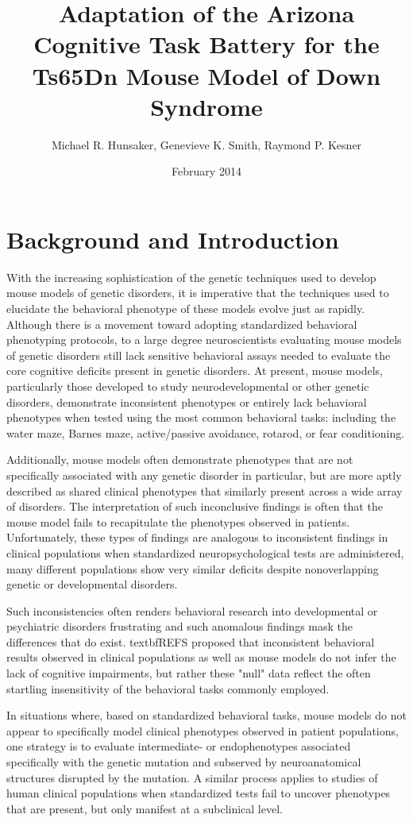 \documentclass{article}
\title{Adaptation of the Arizona Cognitive Task Battery for the Ts65Dn Mouse Model of Down Syndrome}
\author{Michael R. Hunsaker, Genevieve K. Smith, Raymond P. Kesner}
\date{February 2014}
\begin{document}
\maketitle

\section{Background and Introduction}
With the increasing sophistication of the genetic techniques used to develop mouse models of genetic disorders, it is imperative that the techniques used to elucidate the behavioral phenotype of these models evolve just as rapidly. Although there is a movement toward adopting standardized behavioral phenotyping protocols, to a large degree neuroscientists evaluating mouse models of genetic disorders still lack sensitive behavioral assays needed to evaluate the core cognitive deficits present in genetic disorders. At present, mouse models, particularly those developed to study neurodevelopmental or other genetic disorders, demonstrate inconsistent phenotypes or entirely lack behavioral phenotypes when tested using the most common behavioral tasks: including the water maze, Barnes maze, active/passive avoidance, rotarod, or fear conditioning.

Additionally, mouse models often demonstrate phenotypes that are not specifically associated with any genetic disorder in particular, but are more aptly described as shared clinical phenotypes that similarly present across a wide array of disorders. The interpretation of such inconclusive findings is often that the mouse model fails to recapitulate the phenotypes observed in patients. Unfortunately, these types of findings are analogous to inconsistent findings in clinical populations when standardized neuropsychological tests are administered, many different populations show very similar deficits despite nonoverlapping genetic or developmental disorders.

Such inconsistencies often renders behavioral research into developmental or psychiatric disorders frustrating and such anomalous findings mask the differences that do exist. textbf{REFS} proposed that inconsistent behavioral results observed in clinical populations as well as mouse models do not infer the lack of cognitive impairments, but rather these "null" data reflect the often startling insensitivity of the behavioral tasks commonly employed.

In situations where, based on standardized behavioral tasks, mouse models do not appear to specifically model clinical phenotypes observed in patient populations, one strategy is to evaluate intermediate- or endophenotypes associated specifically with the genetic mutation and subserved by neuroanatomical structures disrupted by the mutation. A similar process applies to studies of human clinical populations when standardized tests fail to uncover phenotypes that are present, but only manifest at a subclinical level.
\end{document}
